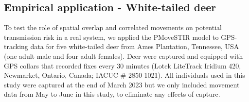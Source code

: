 \documentclass[letterpaper]{article}
\begin{document}


\subsection*{Empirical application - White-tailed deer}

To test the role of spatial overlap and correlated movements on potential transmission risk in a real system, we applied the PMoveSTIR model to GPS-tracking data for five white-tailed deer from Ames Plantation, Tennessee, USA (one adult male and four adult females). 
Deer were captured and equipped with GPS collars that recorded fixes every 30 minutes (Lotek LiteTrack Iridium 420, Newmarket, Ontario, Canada; IACUC \# 2850-1021).  All individuals used in this study were captured at the end of March 2023 but we only included movement data from May to June in this study, to eliminate any effects of capture. 
\end{document}
